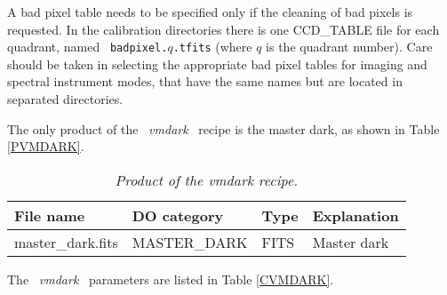 A bad pixel table needs to be specified only if the cleaning of bad
pixels is requested. In the calibration directories there is one
CCD\_TABLE file for each quadrant, named \ {\tt badpixel.}$q${\tt .tfits}
(where $q$ is the quadrant number). Care should be taken in selecting
the appropriate bad pixel tables for imaging and spectral instrument
modes, that have the same names but are located in separated directories.

The only product of the \ {\it vmdark} \ recipe is the master dark, as 
shown in Table \ref{PVMDARK}. 

\begin{table}[h]
  \begin{center}
    \begin{tabular}{|l|l|l|l|}
    \hline
      {\bf File name} & {\bf DO category} & {\bf Type} & {\bf Explanation} \\
    \hline
      master\_dark.fits &  MASTER\_DARK & FITS & Master dark \\
    \hline
    \end{tabular}
    \caption{\it Product of the vmdark recipe.}
    \label{tab:PVMDARK}
  \end{center}
\end{table}

The \ {\it vmdark} \ parameters are listed in Table \ref{CVMDARK}.

